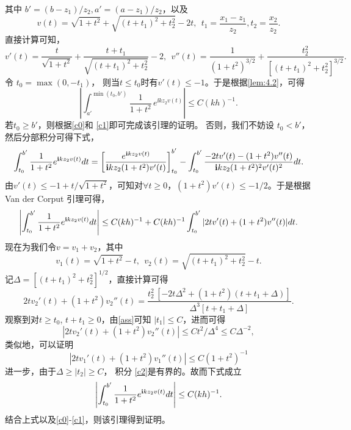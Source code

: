其中 $b'=(b-z_1)/z_2,a'=(a-z_1)/z_2$，以及
\begin{equation*}
v(t)=\sqrt{1+t^2}+\sqrt{(t+t_1)^2+t_2^2}-2t,\ \ t_1=\frac{x_1-z_1}{z_2},t_2=\frac{x_2}{z_2}.
\end{equation*}
直接计算可知，
$$
v'(t)=\frac{t}{\sqrt{1+t^2}}+\frac{t+t_1}{\sqrt{(t+t_1)^2+t_2^2}}-2,\ \
v''(t)=\frac{1}{(1+t^2)^{3/2}}+\frac{t^2_2}{[(t+t_1)^2+t_2^2]^{3/2}}.
$$
令 $t_0=\max(0,-t_1)$， 则当$t\leq t_0$时有$v'(t)\leq -1$。于是根据\ref{lem:4.2}，可得
\begin{equation}\label{c1}
\left|\int_{a'}^{\min(t_0,b')}\frac{1}{1+t^2}\,e^{\ii kz_2v(t)}\right|\leq C(kh)^{-1}.
\end{equation}
若$t_0\geq b'$，则根据\eqref{c0}和 \eqref{c1}即可完成该引理的证明。 否则，我们不妨设 $t_0<b'$，然后分部积分可得下式，
$$
\int^{b'}_{t_0}\frac 1{1+t^2}e^{\mathbf{i} kz_2v(t)}dt=\left[\frac{e^{\mathbf{i} kz_2v(t)}}{\mathbf{i} kz_2(1+t^2)v'(t)}\right]^{b'}_{t_0}-\int^{b'}_{t_0}\frac{-2tv'(t)-(1+t^2)v''(t)}
{\mathbf{i} kz_2(1+t^2)^2v'(t)^2}dt.
$$
由$v'(t)\leq -1+t/\sqrt{1+t^2}$，可知对$\forall t\geq 0$，$(1+t^2)v'(t)\leq -1/2$。于是根据Van der Corput 引理可得，
\begin{equation}\label{c2}
\left|\int^{b'}_{t_0}\frac 1{1+t^2}e^{\mathbf{i} kz_2v(t)}dt\right|\le C(kh)^{-1}+C(kh)^{-1}\int^{b'}_{t_0}|2tv'(t)+(1+t^2)v''(t)|dt.
\end{equation}
现在为我们令$v=v_1+v_2$，其中
\begin{equation*}
v_1(t)=\sqrt{1+t^2}-t,\ \ v_2(t)=\sqrt{(t+t_1)^2+t_2^2}-t.
\end{equation*}
记$\Delta=[(t+t_1)^2+t_2^2]^{1/2}$，直接计算可得
\begin{equation*}
2tv_2'(t)+(1+t^2)v_2''(t)=\frac{t^2_2\,[-2t\Delta^2+(1+t^2)(t+t_1+\Delta)]}{\Delta^3[t+t_1+\Delta]}.
\end{equation*}
观察到对$t\geq t_0$, $t+t_1\geq0$，由\eqref{ass}可知 $|t_1|\leq C$，进而可得
\begin{equation*}
 |2tv_2'(t)+(1+t^2)v_2''(t)|\leq Ct^2/\Delta^4\leq C\Delta^{-2},
\end{equation*}
类似地，可以证明
\begin{equation*}
  |2tv_1'(t)+(1+t^2)v_1''(t)|\le C(1+t^2)^{-1}
\end{equation*}
进一步，由于$\Delta\geq|t_2|\geq C$， 积分 \eqref{c2}是有界的。故而下式成立
\begin{equation}\label{c3}
 \left|\int^{b'}_{t_0}\frac 1{1+t^2}e^{\mathbf{i} kz_2v(t)}dt\right|\le C(kh)^{-1}.
\end{equation}
结合上式以及\eqref{c0}-\eqref{c1}，则该引理得到证明。
